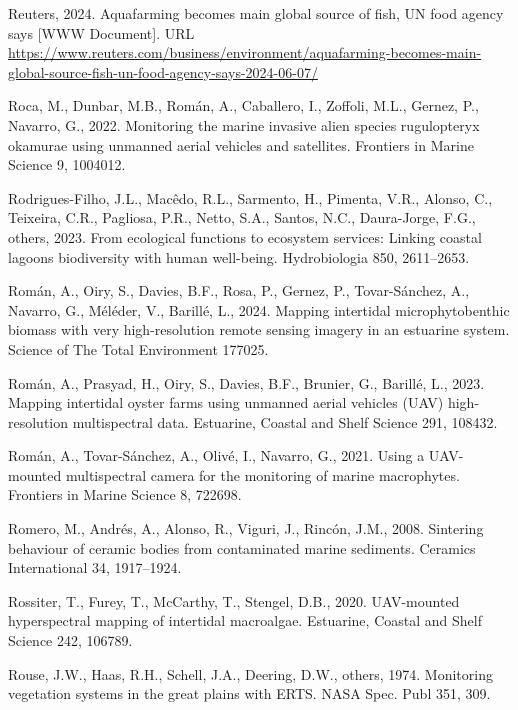 \documentclass[
  letterpaper,
  11pt,
  english,
  singlespacing,
  headsepline]{MastersDoctoralThesis}
\newlength{\cslhangindent}
\newenvironment{CSLReferences}[2] %
 {\begin{list}{}{%
  \setlength{\itemindent}{0pt}
  \setlength{\leftmargin}{0pt}
  \setlength{\parsep}{0pt}
  \ifodd #1
   \setlength{\leftmargin}{\cslhangindent}
   \setlength{\itemindent}{-1\cslhangindent}
  \fi
  \setlength{\itemsep}{#2\baselineskip}}}
 {\end{list}}
\begin{document}
\begin{CSLReferences}{1}{0}
Reuters, 2024. Aquafarming becomes main global source of fish, {UN} food
agency says {[}WWW Document{]}. URL
\url{https://www.reuters.com/business/environment/aquafarming-becomes-main-global-source-fish-un-food-agency-says-2024-06-07/}

Roca, M., Dunbar, M.B., Román, A., Caballero, I., Zoffoli, M.L., Gernez,
P., Navarro, G., 2022. Monitoring the marine invasive alien species
rugulopteryx okamurae using unmanned aerial vehicles and satellites.
Frontiers in Marine Science 9, 1004012.

Rodrigues-Filho, J.L., Macêdo, R.L., Sarmento, H., Pimenta, V.R.,
Alonso, C., Teixeira, C.R., Pagliosa, P.R., Netto, S.A., Santos, N.C.,
Daura-Jorge, F.G., others, 2023. From ecological functions to ecosystem
services: Linking coastal lagoons biodiversity with human well-being.
Hydrobiologia 850, 2611--2653.

Román, A., Oiry, S., Davies, B.F., Rosa, P., Gernez, P., Tovar-Sánchez,
A., Navarro, G., Méléder, V., Barillé, L., 2024. Mapping intertidal
microphytobenthic biomass with very high-resolution remote sensing
imagery in an estuarine system. Science of The Total Environment 177025.

Román, A., Prasyad, H., Oiry, S., Davies, B.F., Brunier, G., Barillé,
L., 2023. Mapping intertidal oyster farms using unmanned aerial vehicles
(UAV) high-resolution multispectral data. Estuarine, Coastal and Shelf
Science 291, 108432.

Román, A., Tovar-Sánchez, A., Olivé, I., Navarro, G., 2021. Using a
UAV-mounted multispectral camera for the monitoring of marine
macrophytes. Frontiers in Marine Science 8, 722698.

Romero, M., Andrés, A., Alonso, R., Viguri, J., Rincón, J.M., 2008.
Sintering behaviour of ceramic bodies from contaminated marine
sediments. Ceramics International 34, 1917--1924.

Rossiter, T., Furey, T., McCarthy, T., Stengel, D.B., 2020. UAV-mounted
hyperspectral mapping of intertidal macroalgae. Estuarine, Coastal and
Shelf Science 242, 106789.

Rouse, J.W., Haas, R.H., Schell, J.A., Deering, D.W., others, 1974.
Monitoring vegetation systems in the great plains with ERTS. NASA Spec.
Publ 351, 309.


\end{CSLReferences}
\end{document}
